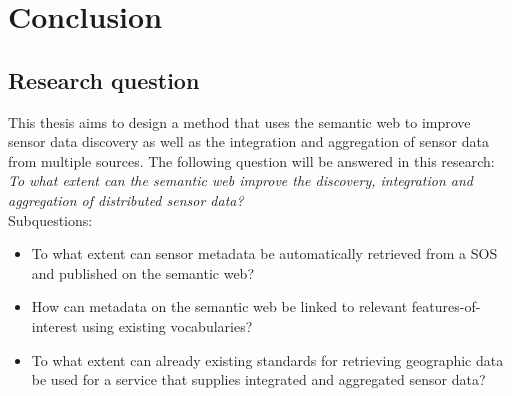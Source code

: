 
\chapter{Conclusion}
\label{chap:conclusion}

\section{Research question}
This thesis aims to design a method that uses the semantic web to improve sensor data discovery as well as the integration and aggregation of sensor data from multiple sources. The following question will be answered in this research:   
\textit{To what extent can the semantic web improve the discovery, integration and aggregation of distributed sensor data?} \\

Subquestions:
\begin{itemize}
	\item To what extent can sensor metadata be automatically retrieved from a SOS and published
	on the semantic web?
	\item How can metadata on the semantic web be linked to relevant features-of-interest using
	existing vocabularies?
	\item To what extent can already existing standards for retrieving geographic data be used for
	a service that supplies integrated and aggregated sensor data?
\end{itemize}
